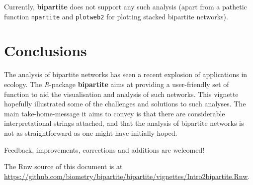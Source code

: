 \documentclass[a4paper, 11pt]{article}\usepackage[]{graphicx}\usepackage[]{color}
\newcommand{\package}[1]{\textbf{#1}}
\newcommand{\proglang}[1]{\textsl{#1}}
\newcommand{\code}[1]{\texttt{#1}}
\begin{document}
Currently, \package{bipartite} does not support any such analysis (apart from a pathetic function \code{npartite} and \code{plotweb2} for plotting stacked bipartite networks).


\section*{Conclusions}%
The analysis of bipartite networks has seen a recent explosion of applications in ecology. The \proglang{R}-package \package{bipartite} aims at providing a user-friendly set of function to aid the visualisation and analysis of such networks. This vignette hopefully illustrated some of the challenges and solutions to such analyses. The main take-home-message it aims to convey is that there are considerable interpretational strings attached, and that the analysis of bipartite networks is not as straightforward as one might have initially hoped.

\medskip
\noindent Feedback, improvements, corrections and additions are welcomed!







\bigskip

The Rnw source of this document is at \url{https://github.com/biometry/bipartite/bipartite/vignettes/Intro2bipartite.Rnw}.

\setlength{\bibsep}{0cm}
\def\bibfont{\small}


\printindex
\end{document}
